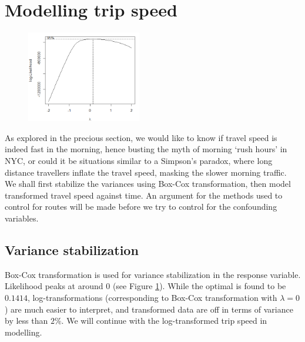 \documentclass[10pt,a4paper]{article} %
\begin{document}
{    
    

    \section{Modelling trip speed}
    
    \begin{figure}
        \includegraphics[width=5cm]{boxcox.png}
        \label{fig:boxcox}
    \end{figure}
    
    As explored in the precious section, we would like to know if travel speed is indeed fast in the morning, hence busting the myth of morning `rush hours' in NYC, or could it be situations similar to a Simpson's paradox, where long distance travellers inflate the travel speed, masking the slower morning traffic.\\
    
    We shall first stabilize the variances using Box-Cox transformation, then model transformed travel speed against time. An argument for the methods used to control for routes will be made before we try to control for the confounding variables.
    
    \subsection{Variance stabilization}
    
    Box-Cox transformation is used for variance stabilization in the response variable. Likelihood peaks at around $0$ (see Figure \ref{fig:boxcox}). While the optimal is found to be $0.1414$, log-transformations (corresponding to Box-Cox transformation with $\lambda=0$) are much easier to interpret, and transformed data are off in terms of variance by less than $2\%$. We will continue with the log-transformed trip speed in modelling.
    
}
\end{document}
